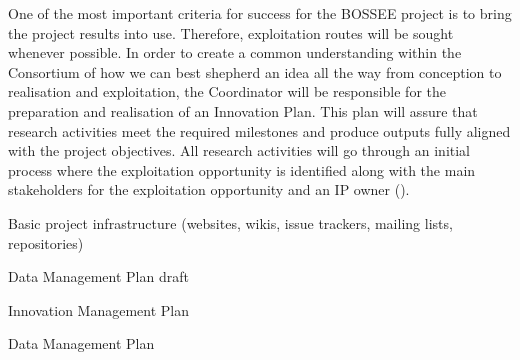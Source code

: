 \begin{workpackage}
\begin{tasklist}
\begin{task}[
  title=Innovation Management,
  id=innovation-management,
  lead=SRL,
  PM=6,
  wphases={0-48},
  partners={CDS,EGI,EP,INSERM,QS,UIO,UPSUD,SIL,WTT,XFEL}
]
One of the most important criteria for success for the BOSSEE project is to bring the project results into use. Therefore, exploitation routes will be sought whenever possible. In order to create a common understanding within the Consortium of how we can best shepherd an idea all the way from conception to realisation and exploitation, the Coordinator will be responsible for the preparation and realisation of an Innovation Plan. This plan will assure that research activities meet the required milestones and produce outputs fully aligned with the project objectives. All research activities will go through an initial process where the exploitation opportunity is identified along with the main stakeholders for the exploitation opportunity and an IP owner
().
\end{task}

\end{tasklist}


\begin{wpdelivs}

\begin{wpdeliv}[due=1,miles=startup,id=infrastructure,dissem=PU,nature=DEC,lead=SRL]
  {Basic project infrastructure (websites, wikis, issue trackers, mailing lists, repositories)}
\end{wpdeliv}

\begin{wpdeliv}[due=9,miles=startup,id=data-management-plan-draft,dissem=PU,nature=R,lead=SRL]
  {Data Management Plan draft}
\end{wpdeliv}

\begin{wpdeliv}[due=9,miles=startup,id=innovation-management-plan,dissem=CO,nature=R,lead=SRL]
  {Innovation Management Plan}
\end{wpdeliv}

\begin{wpdeliv}[due=48,miles=final,id=data-management-plan,dissem=PU,nature=R,lead=SRL]
  {Data Management Plan}
\end{wpdeliv}

\end{wpdelivs}
\end{workpackage}

